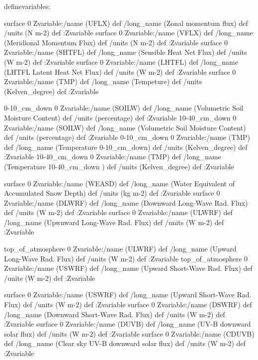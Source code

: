 \begin{ingrid}

definevariables:

surface 0 Zvariable:/name (UFLX) def /long_name (Zonal momentum flux) def /units (N m-2) def :Zvariable
surface 0 Zvariable:/name (VFLX) def /long_name (Meridional Momentum Flux) def /units (N m-2) def :Zvariable
surface 0 Zvariable:/name (SHTFL) def /long_name (Sensible Heat Net Flux) def /units (W m-2) def :Zvariable
surface 0 Zvariable:/name (LHTFL) def /long_name (LHTFL Latent Heat Net Flux) def /units (W m-2) def :Zvariable
surface 0 Zvariable:/name (TMP) def /long_name (Tempeture) def /units (Kelven_degree) def :Zvariable

\end{ingrid}
\begin{ingrid}

0-10_cm_down 0 Zvariable:/name (SOILW) def /long_name (Volumetric Soil Moisture Content) def /units (percentage) def :Zvariable
10-40_cm_down 0 Zvariable:/name (SOILW) def /long_name (Volumetric Soil Moisture Content) def /units (percentage) def :Zvariable
0-10_cm_down 0 Zvariable:/name (TMP) def /long_name (Temperature 0-10_cm_down) def /units (Kelven_degree) def :Zvariable
10-40_cm_down 0 Zvariable:/name (TMP) def /long_name (Temperature 10-40_cm_down ) def /units (Kelven_degree) def :Zvariable

\end{ingrid}
\begin{ingrid}

surface 0 Zvariable:/name (WEASD) def /long_name (Water Equivalent of Accumulated Snow Depth) def /units (kg m-2) def :Zvariable
surface 0 Zvariable:/name (DLWRF) def /long_name (Downward Long-Wave Rad. Flux) def /units (W m-2) def :Zvariable
surface 0 Zvariable:/name (ULWRF) def /long_name (Upwnward Long-Wave Rad. Flux) def /units (W m-2) def :Zvariable

\end{ingrid}
\begin{ingrid}

top_of_atmosphere 0 Zvariable:/name (ULWRF) def /long_name (Upward Long-Wave Rad. Flux) def /units (W m-2) def :Zvariable
top_of_atmosphere 0 Zvariable:/name (USWRF) def /long_name (Upward Short-Wave Rad. Flux) def /units (W m-2) def :Zvariable

\end{ingrid}
\begin{ingrid}

surface 0 Zvariable:/name (USWRF) def /long_name (Upward Short-Wave Rad. Flux) def /units (W m-2) def :Zvariable
surface 0 Zvariable:/name (DSWRF) def /long_name (Downward Short-Wave Rad. Flux) def /units (W m-2) def :Zvariable
surface 0 Zvariable:/name (DUVB) def /long_name (UV-B downward solar flux) def /units (W m-2) def :Zvariable
surface 0 Zvariable:/name (CDUVB) def /long_name (Clear sky UV-B downward solar flux) def /units (W m-2) def :Zvariable

\end{ingrid}

